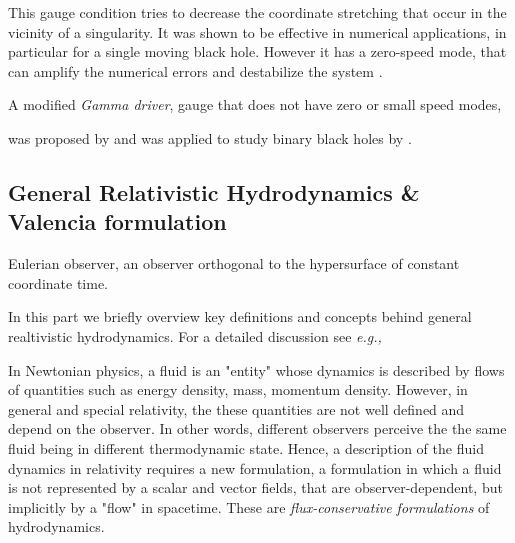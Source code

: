 \documentclass[11pt,a4paper,headinclude=true,DIV=14,BCOR=8mm,chapterprefix,listof=totoc,twoside,openright,abstracton]{scrbook}
\begin{document}

This gauge condition tries to decrease the coordinate stretching that occur in the vicinity of a singularity. It was shown to be effective in numerical applications, in particular for a single moving black hole. However it has a zero-speed mode, that can amplify the numerical errors and destabilize the system \cite{vanMeter:2006vi}.

A modified \textit{Gamma driver}, gauge that does not have zero or small speed modes,


was proposed by \cite{vanMeter:2006vi} and was applied to study binary black holes by \cite{Campanelli:2005dd}.



\subsection{General Relativistic Hydrodynamics \& Valencia formulation}


Eulerian observer, an observer orthogonal to the hypersurface of constant coordinate time.

In this part we briefly overview key definitions and concepts behind general realtivistic hydrodynamics. For a detailed discussion see \textit{e.g.,} \cite{Misner:1973,Schutz:2009a,Gourgoulhon:2006bn,Andersson:2006nr,Rezzolla:2013}


In Newtonian physics, a fluid is an "entity" whose dynamics is described by flows of quantities such as energy density, mass, momentum density. However, in general and special relativity, the these quantities are not well defined and depend on the observer. In other words, different observers perceive the the same fluid being in different thermodynamic state. Hence, a description of the fluid dynamics in relativity requires a new formulation, a formulation in which a fluid is not represented by a scalar and vector fields, that are observer-dependent, but implicitly by a "flow" in spacetime. These are \textit{flux-conservative formulations} of hydrodynamics.
\end{document}
